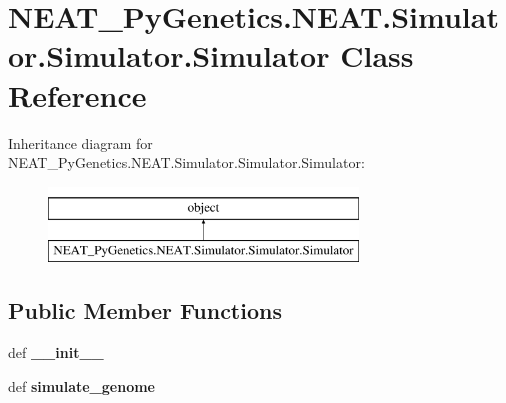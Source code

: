 \hypertarget{class_n_e_a_t___py_genetics_1_1_n_e_a_t_1_1_simulator_1_1_simulator_1_1_simulator}{}\section{N\+E\+A\+T\+\_\+\+Py\+Genetics.\+N\+E\+A\+T.\+Simulator.\+Simulator.\+Simulator Class Reference}
\label{class_n_e_a_t___py_genetics_1_1_n_e_a_t_1_1_simulator_1_1_simulator_1_1_simulator}
Inheritance diagram for N\+E\+A\+T\+\_\+\+Py\+Genetics.\+N\+E\+A\+T.\+Simulator.\+Simulator.\+Simulator\+:\begin{figure}[H]
\begin{center}
\leavevmode
\includegraphics[height=2.000000cm]{class_n_e_a_t___py_genetics_1_1_n_e_a_t_1_1_simulator_1_1_simulator_1_1_simulator}
\end{center}
\end{figure}
\subsection*{Public Member Functions}
\begin{DoxyCompactItemize}
\item 
def {\bfseries \+\_\+\+\_\+init\+\_\+\+\_\+}\hypertarget{class_n_e_a_t___py_genetics_1_1_n_e_a_t_1_1_simulator_1_1_simulator_1_1_simulator_ab768445b7d9b16282919f062e0a42761}{}\label{class_n_e_a_t___py_genetics_1_1_n_e_a_t_1_1_simulator_1_1_simulator_1_1_simulator_ab768445b7d9b16282919f062e0a42761}

\item 
def {\bfseries simulate\+\_\+genome}\hypertarget{class_n_e_a_t___py_genetics_1_1_n_e_a_t_1_1_simulator_1_1_simulator_1_1_simulator_a0e362a7174cae20d0a23b69109ac15bc}{}\label{class_n_e_a_t___py_genetics_1_1_n_e_a_t_1_1_simulator_1_1_simulator_1_1_simulator_a0e362a7174cae20d0a23b69109ac15bc}

\end{DoxyCompactItemize}
